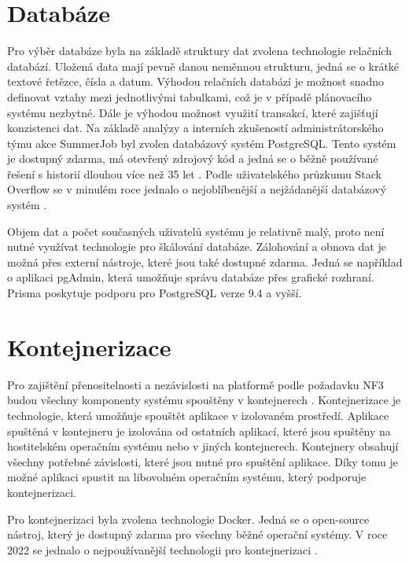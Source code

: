 \section{Databáze}

Pro výběr databáze byla na základě struktury dat zvolena technologie relačních databází. Uložená data mají pevně danou neměnnou strukturu,
jedná se o krátké textové řetězce, čísla a datum. Výhodou relačních databází je možnost snadno definovat vztahy mezi jednotlivými tabulkami,
což je v případě plánovacího systému nezbytné. Dále je výhodou možnost využití transakcí, které zajišťují konzistenci dat.
Na základě analýzy a interních zkušeností administrátorského týmu akce SummerJob byl zvolen databázový systém PostgreSQL. Tento systém je
dostupný zdarma, má otevřený zdrojový kód a jedná se o běžně používané řešení s historií dlouhou více než 35 let \cite{postgresql}.
Podle uživatelského průzkumu Stack Overflow se v minulém roce jednalo o nejoblíbenější a nejžádanější databázový systém \cite{so_dev_survey_db}.

Objem dat a počet současných uživatelů systému je relativně malý, proto není nutné využívat technologie pro škálování databáze. Zálohování a obnova dat
je možná přes externí nástroje, které jsou také dostupné zdarma. Jedná se například o aplikaci pgAdmin, která umožňuje správu databáze přes grafické rozhraní.
Prisma poskytuje podporu pro PostgreSQL verze 9.4 a vyšší.

\section{Kontejnerizace}

Pro zajištění přenositelnosti a nezávislosti na platformě podle požadavku NF3 budou všechny komponenty systému spouštěny v kontejnerech \cite{what_is_container}.
Kontejnerizace je technologie, která umožňuje spouštět aplikace v izolovaném prostředí. Aplikace spuštěná v kontejneru je izolována od ostatních aplikací,
které jsou spuštěny na hostitelském operačním systému nebo v jiných kontejnerech. Kontejnery obsahují
všechny potřebné závislosti, které jsou nutné pro spuštění aplikace. Díky tomu je možné aplikaci spustit na libovolném operačním systému, který podporuje kontejnerizaci.

Pro kontejnerizaci byla zvolena technologie Docker. Jedná se o open-source nástroj, který je dostupný zdarma pro všechny běžné operační systémy.
V roce 2022 se jednalo o nejpoužívanější technologii pro kontejnerizaci \cite{docker_survey}.

